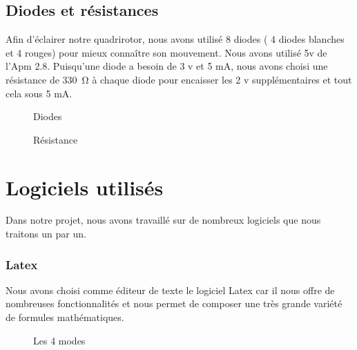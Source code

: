 \documentclass[a4paper,12pt]{book}
\begin{document}
\subsection {Diodes  et résistances}
Afin d'éclairer notre quadrirotor, nous avons utilisé 8 diodes ( 4 diodes blanches et 4  rouges) pour mieux connaître son mouvement. Nous avons utilisé 5v  de l'Apm 2.8. Puisqu'une diode a besoin de 3 v et 5 mA, nous avons choisi une résistance de \SI{330}{\ohm} à chaque diode pour encaisser les 2 v supplémentaires et tout cela sous 5 mA.
\begin{figure}[h]
	\centering
	\begin{minipage}{0.49\textwidth}
		\caption{Diodes}
		\label{fig:my_label1}
	\end{minipage}
	\begin{minipage}{0.49\textwidth}
	\caption{Résistance}
	\label{fig:my_label}
\end{minipage}
\end{figure}
\section{Logiciels utilisés}
Dans notre projet, nous avons travaillé sur de nombreux logiciels que nous traitons un par un.
\subsubsection{Latex}
Nous avons choisi comme éditeur de texte le logiciel Latex car il nous  offre de nombreuses fonctionnalités et nous permet de composer une très grande variété de formules mathématiques.
\begin{figure}[h]
	\begin{center}
		\centering
	\end{center}
	\caption{Les 4 modes}
\end{figure}
\end{document}
